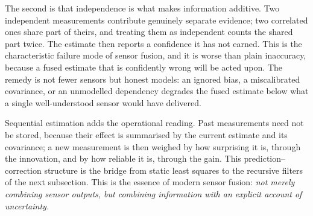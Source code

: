 The second is that independence is what makes information additive. Two independent measurements contribute genuinely separate evidence; two correlated ones share part of theirs, and treating them as independent counts the shared part twice. The estimate then reports a confidence it has not earned. This is the characteristic failure mode of sensor fusion, and it is worse than plain inaccuracy, because a fused estimate that is confidently wrong will be acted upon. The remedy is not fewer sensors but honest models: an ignored bias, a miscalibrated covariance, or an unmodelled dependency degrades the fused estimate below what a single well-understood sensor would have delivered.

Sequential estimation adds the operational reading. Past measurements need not be stored, because their effect is summarised by the current estimate and its covariance; a new measurement is then weighed by how surprising it is, through the innovation, and by how reliable it is, through the gain. This prediction--correction structure is the bridge from static least squares to the recursive filters of the next subsection.
This is the essence of modern sensor fusion: \emph{not merely combining sensor outputs, but combining information with an explicit account of uncertainty.}



